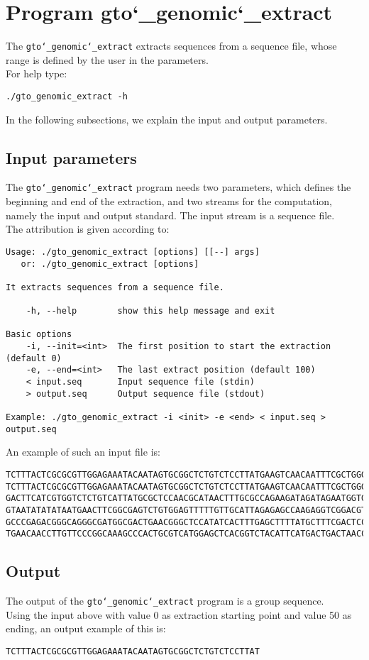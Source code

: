 \section{Program gto\char`_genomic\char`_extract}
The \texttt{gto\char`_genomic\char`_extract} extracts sequences from a sequence file, whose range is defined by the user in the parameters.\\
For help type:
\begin{lstlisting}
./gto_genomic_extract -h
\end{lstlisting}
In the following subsections, we explain the input and output parameters.

\subsection*{Input parameters}

The \texttt{gto\char`_genomic\char`_extract} program needs two parameters, which defines the beginning and end of the extraction, and two streams for the computation, namely the input and output standard. The input stream is a sequence file.\\
The attribution is given according to:
\begin{lstlisting}
Usage: ./gto_genomic_extract [options] [[--] args]
   or: ./gto_genomic_extract [options]

It extracts sequences from a sequence file.

    -h, --help        show this help message and exit

Basic options
    -i, --init=<int>  The first position to start the extraction (default 0)
    -e, --end=<int>   The last extract position (default 100)
    < input.seq       Input sequence file (stdin)
    > output.seq      Output sequence file (stdout)

Example: ./gto_genomic_extract -i <init> -e <end> < input.seq > output.seq
\end{lstlisting}
An example of such an input file is:
\begin{lstlisting}
TCTTTACTCGCGCGTTGGAGAAATACAATAGTGCGGCTCTGTCTCCTTATGAAGTCAACAATTTCGCTGGGACTTGCGGC
TCTTTACTCGCGCGTTGGAGAAATACAATAGTGCGGCTCTGTCTCCTTATGAAGTCAACAATTTCGCTGGGACTTGCGGC
GACTTCATCGTGGTCTCTGTCATTATGCGCTCCAACGCATAACTTTGCGCCAGAAGATAGATAGAATGGTGTAAGAAACT
GTAATATATATAATGAACTTCGGCGAGTCTGTGGAGTTTTTGTTGCATTAGAGAGCCAAGAGGTCGGACGTCCTCACGTA
GCCCGAGACGGGCAGGGCGATGGCGACTGAACGGGCTCCATATCACTTTGAGCTTTTATGCTTTCGACTCCTCCAGGAGC
TGAACAACCTTGTTCCCGGCAAAGCCCACTGCGTCATGGAGCTCACGGTCTACATTCATGACTGACTAACCGTAAACTGC
\end{lstlisting}

\subsection*{Output}
The output of the \texttt{gto\char`_genomic\char`_extract} program is a group sequence.\\
Using the input above with value 0 as extraction starting point and value 50 as ending, an output example of this is:
\begin{lstlisting}
TCTTTACTCGCGCGTTGGAGAAATACAATAGTGCGGCTCTGTCTCCTTAT
\end{lstlisting}